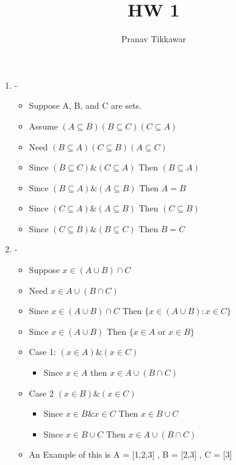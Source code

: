 \documentclass{article}
\author{Pranav Tikkawar}
\title{HW 1}
\begin{document}
\maketitle
\begin{enumerate}
    \item -
    \begin{itemize}
        \item Suppose A, B, and C are sets.
        \item Assume $(A \subseteq B) (B \subseteq C) (C \subseteq A) $
        \item Need  $(B \subseteq A) (C \subseteq B) (A \subseteq C) $
        \item Since $(B \subseteq C) \& (C \subseteq A) $ Then $(B \subseteq A) $
        \item Since $(B \subseteq A) \& (A \subseteq B)$ Then $A = B$ 
        \item Since $(C \subseteq A) \& (A \subseteq B) $ Then $(C \subseteq B) $
        \item Since $(C \subseteq B) \& (B \subseteq C)$ Then $B = C$ 
    \end{itemize}
    \item - 
    \begin{itemize}
        \item Suppose $ x \in (A \cup B) \cap C $
        \item Need $ x \in A \cup (B \cap C) $
        \item Since $ x \in (A \cup B) \cap C $ Then $ \{ x \in (A \cup B): x \in C \}  $ 
        \item Since $x \in (A \cup B) $ Then $\{ x \in A $ or $ x \in B \} $
        \item Case 1: $ (x \in A) \& (x \in C) $ 
        \begin{itemize}
            \item Since $x \in A$ then $ x \in A \cup (B \cap C) $ 
        \end{itemize}
        \item Case 2 $ (x \in B) \& (x \in C) $ 
        \begin{itemize}
            \item Since $ x \in B \& x \in C $ Then $x \in B \cup C $
            \item Since $x \in B \cup C$ Then $x \in A \cup (B \cap C) $ 
        \end{itemize}
        \item An Example of this is A = [1,2,3] , B = [2,3] , C = [3]
    \end{itemize}

\end{enumerate}
\end{document}
